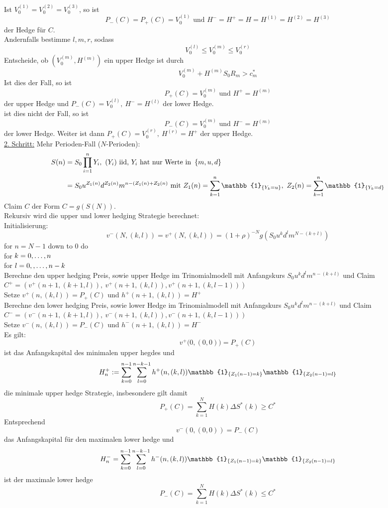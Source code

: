 Ist $V_0^{(1)}=V_0^{(2)}=V_0^{(3)}$, so ist 
\[
P_-(C)=P_+(C)=V_0^{(1)}\text{ und }H^-=H^+=H=H^{(1)}=H^{(2)}=H^{(3)}
\]
der Hedge für $C$.\\
Andernfalls bestimme $l,m,r$, sodass
\[
V_0^{(l)}\le V_0^{(m)}\le V_0^{(r)}
\]
Entscheide, ob $(V_0^{(m)},H^{(m)})$ ein upper Hedge ist durch
\[
V_0^{(m)}+H^{(m)}S_0R_m>c_m^*
\]
Ist dies der Fall, so ist
\[
P_+(C)=V_0^{(m)}\text{ und }H^+=H^{(m)}
\]
der upper Hedge und $P_-(C)=V_0^{(l)},~H^-=H^{(l)}$ der lower Hedge.\\
ist dies nicht der Fall, so ist
\[
P_-(C)=V_0^{(m)}\text{ und }H^-=H^{(m)}
\]
der lower Hedge.
Weiter ist dann $P_+(C)=V_0^{(r)},~H^{(r)}=H^+$ der upper Hedge.\\

\uline{2. Schritt:} Mehr Perioden-Fall ($N$-Perioden):
\begin{equation*}
\begin{aligned}
	S(n)&=S_0\prod_{i=1}^{n}Y_i,~(Y_i)\text{ iid, }Y_i\text{ hat nur Werte in }\penbrace{m,u,d}\\
	&= S_0u^{Z_1(n)}d^{Z_2(n)}m^{n-(Z_1(n)+Z_2(n)}\text{ mit }Z_1(n)=\sum_{k=1}^{n}\mathbb{1}_{\penbrace{Y_k=u}},~ Z_2(n)=\sum_{k=1}^{n}\mathbb{1}_{\penbrace{Y_k=d}}
\end{aligned}
\end{equation*}
Claim $C$ der Form $C=g(S(N))$.\\
Rekursiv wird die upper und lower hedging Strategie berechnet:\\
Initialisierung:
\[
v^-(N,(k,l))=v^+(N,(k,l))=(1+\rho)^{-N}g(S_0u^kd^lm^{N-(k+l)})
\]
for $n=N-1$ down to 0 do\\
	for $k=0, \dots ,n$\\
	for $l=0,, \dots ,n-k$\\
	Berechne den upper hedging Preis, sowie upper Hedge im Trinomialmodell mit Anfangskurs $S_0u^kd^lm^{n-(k+l)}$ und Claim $C^+=(v^+(n+1,(k+1,l)),~v^+(n+1,(k,l)),v^+(n+1,(k,l-1)))$\\
	Setze $v^+(n,(k,l))=P_+(C)$ und $h^+(n+1,(k,l))=H^+$\\
	Berechne den lower hedging Preis, sowie lower Hedge im Trinomialmodell mit Anfangskurs $S_0u^kd^lm^{n-(k+l)}$ und Claim $C^-=(v^-(n+1,(k+1,l)),~v^-(n+1,(k,l)),v^-(n+1,(k,l-1)))$\\
	Setze $v^-(n,(k,l))=P_-(C)$ und $h^-(n+1,(k,l))=H^-$\\

Es gilt:
\[
v^+\big(0,(0,0)\big)=P_+(C)
\]
ist das Anfangskapital des minimalen upper hegdes und 
\[
H_n^+:=\sum_{k=0}^{n-1}\sum_{l=0}^{n-k-1}h^+(n,(k,l))\mathbb{1}_{\penbrace{Z_1(n-1)=k}}\mathbb{1}_{\penbrace{Z_2(n-1)=l}}
\]
die minimale upper hedge Strategie, insbesondere gilt damit
\[
P_+(C)=\sum_{k=1}^{N}H(k)\Delta S^*(k)\ge C^*
\]
Entsprechend
\[
v^-(0,(0,0))=P_-(C)
\]
das Anfangskapital für den maximalen lower hedge und
\[
H_n^-=\sum_{k=0}^{n-1}\sum_{l=0}^{n-k-1}h^-(n,(k,l))\mathbb{1}_{\penbrace{Z_1(n-1)=k}}\mathbb{1}_{\penbrace{Z_2(n-1)=l}}
\]
ist der maximale lower hedge
\[
P_-(C)=\sum_{k=1}^{N}H(k)\Delta S^*(k)\le C^*
\]

